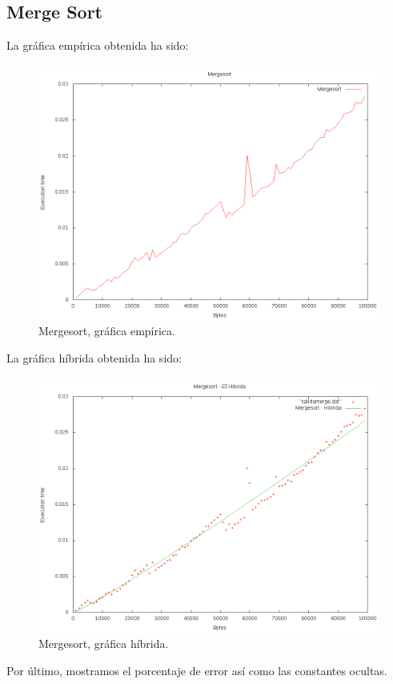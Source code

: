\subsection{Merge Sort}
La gráfica empírica obtenida ha sido:
\begin{figure}[H]
	\centering
	\includegraphics[scale=0.5]{imagenes/mergesort.png}
	\caption{Mergesort, gráfica empírica.}
	\label{fig:E14}
\end{figure}
La gráfica híbrida obtenida ha sido:
\begin{figure}[H]
	\centering
	\includegraphics[scale=0.5]{imagenes/mergesort-hibrida.png}
	\caption{Mergesort, gráfica híbrida.}
	\label{fig:E15}
\end{figure}
Por último, mostramos el porcentaje de error así como las constantes ocultas.\\
